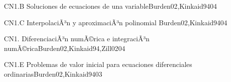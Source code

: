 \begin{syllabus}
\begin{unit}{CN1.B Soluciones de ecuaciones de una variable}{Burden02,Kinkaid94}{0}{4}
\begin{topics}
      \item \CNONETopicIterative
   \end{topics}
   \begin{unitgoals}
      \item \CNONEObjONE
      \item \CNONEObjTWO
      \item \CNONEObjTHREE
      \item \CNONEObjFOUR
   \end{unitgoals}
\end{unit}

\begin{unit}{CN1.C InterpolaciÃ³n y aproximaciÃ³n polinomial }{Burden02,Kinkaid94}{0}{4}
\begin{topics}
      \item \CNONETopicCurve
   \end{topics}

   \begin{unitgoals}
      \item \CNONEObjONE
      \item \CNONEObjTWO
      \item \CNONEObjTHREE
      \item \CNONEObjFOUR
   \end{unitgoals}
\end{unit}

\begin{unit}{CN1. DiferenciaciÃ³n numÃ©rica e integraciÃ³n numÃ©rica}{Burden02,Kinkaid94,Zill02}{0}{4}
\begin{topics}
      \item \CNONETopicNumerical
      \item \CNONETopicExplicit
   \end{topics}

   \begin{unitgoals}
      \item \CNONEObjONE
      \item \CNONEObjTWO
      \item \CNONEObjTHREE
      \item \CNONEObjFOUR
   \end{unitgoals}
\end{unit}

\begin{unit}{CN1.E Problemas de valor inicial para ecuaciones diferenciales ordinarias}{Burden02,Kinkaid94}{0}{3}
\begin{topics}
      \item \CNONETopicDifferential
   \end{topics}


\end{unit}
\end{syllabus}
